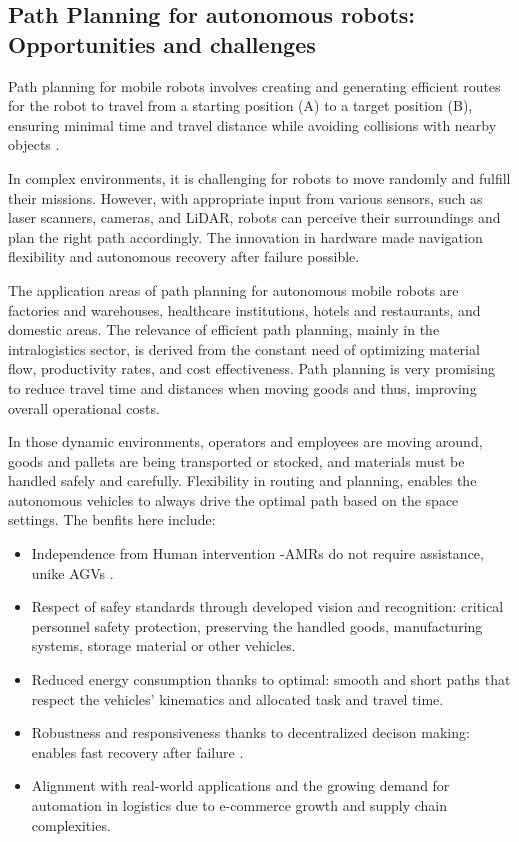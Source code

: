 \subsection{Path Planning for autonomous robots: Opportunities and challenges}

Path planning for mobile robots involves creating and generating efficient routes 
for the robot to travel from a starting position (A) to a target position (B), 
ensuring minimal time and travel distance while avoiding collisions with nearby objects \cite{R7}.

In complex environments, it is challenging for robots to move randomly and fulfill 
their missions. However, with appropriate input from various sensors, such as laser 
scanners, cameras, and LiDAR, robots can perceive their surroundings and plan the right path
accordingly. The innovation in hardware made navigation flexibility and autonomous recovery 
after failure possible\cite{R7}.

The application areas of path planning for autonomous mobile robots are factories and warehouses, 
healthcare institutions, hotels and restaurants, and domestic areas.
The relevance of efficient path planning, mainly in the intralogistics sector, is derived from the constant need 
of optimizing material flow, productivity rates, and cost effectiveness. Path planning is very promising to reduce
travel time and distances when moving goods and thus, improving overall operational costs. 

In those dynamic environments, operators and employees are moving around, goods and pallets are 
being transported or stocked, and materials must be handled safely and carefully.
Flexibility in routing and planning, enables the autonomous vehicles to always drive the optimal path
based on the space settings. The benfits here include:
\begin{itemize}
    \item Independence from Human intervention -AMRs do not require assistance, unike AGVs \cite{R7}.
    \item Respect of safey standards through developed vision and recognition: critical personnel safety protection,
    preserving the handled goods, 
    manufacturing systems, storage material or other vehicles.
    \item Reduced energy consumption thanks to optimal: smooth and short paths that respect the vehicles' kinematics
    and allocated task and travel time.
    \item Robustness and responsiveness thanks to decentralized decison making: enables fast recovery after failure \cite{R7}.
    \item Alignment with real-world applications and the growing demand for automation in logistics due to e-commerce 
    growth and supply chain complexities.
\end{itemize}

